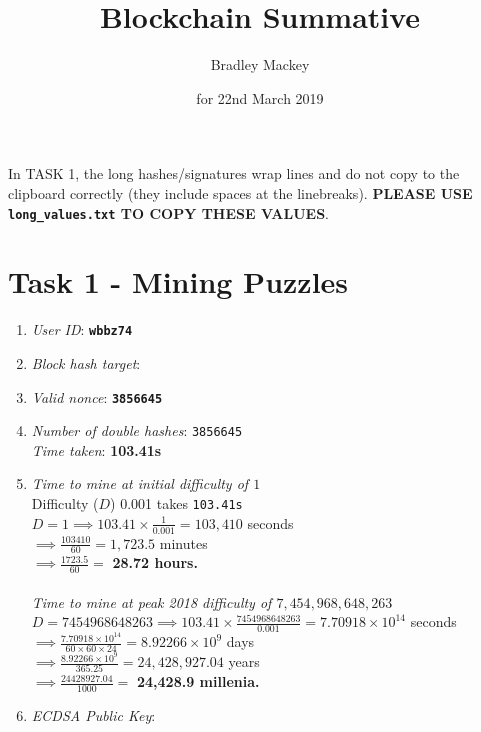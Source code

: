 \documentclass[11pt]{article}
\begin{document}
\title{\textbf{Blockchain Summative}}
\date{for 22nd March 2019}
\author{Bradley Mackey}
\maketitle

In TASK 1, the long hashes/signatures wrap lines and do not copy to the clipboard correctly (they include spaces at the linebreaks). \textbf{PLEASE USE \texttt{long\_values.txt} TO COPY THESE VALUES}.

\section*{Task 1 - Mining Puzzles}

\begin{enumerate}
\item \textit{User ID}: \textbf{\texttt{wbbz74}}
\item \textit{Block hash target}: \texttt{}
\item \textit{Valid nonce}: \textbf{\texttt{3856645}}
\item \textit{Number of double hashes}: \texttt{3856645}\\\textit{Time taken}: \textbf{103.41s}
\item 
\textit{Time to mine at initial difficulty of $1$}\\
Difficulty ($D$) 0.001 takes \texttt{103.41s}\\
$D=1 \implies 103.41\times{\frac{1}{0.001}}=103,410$ seconds\\
$\implies \frac{103410}{60}=1,723.5$ minutes\\
$\implies \frac{1723.5}{60}=$ \textbf{28.72 hours.}\\
\\
\textit{Time to mine at peak 2018 difficulty of $7,454,968,648,263$}\\
$D=7454968648263 \implies 103.41\times{\frac{7454968648263}{0.001}}=7.70918\times10^{14}$ seconds\\
$\implies \frac{7.70918\times10^{14}}{60\times60\times24}=8.92266\times10^{9}$ days\\
$\implies \frac{8.92266\times10^{9}}{365.25}=24,428,927.04$ years\\
$\implies \frac{24428927.04}{1000}=$ \textbf{24,428.9 millenia.}\\

\item \textit{ECDSA Public Key}: \texttt{}


\end{enumerate}
\end{document}
